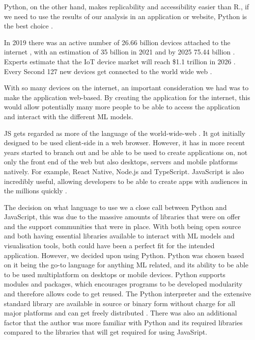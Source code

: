 	Python, on the other hand, makes replicability and accessibility easier than R., if we need to use the results of our analysis in an application or website, Python is the best choice \cite{r_vs_py}.
	
	In 2019 there was an active number of 26.66 billion devices attached to the internet \cite{securitytoday, statista_iot}, with an estimation of 35 billion in 2021 \cite{securitytoday} and by 2025 75.44 billion \cite{statista_iot}. Experts estimate that the IoT device market will reach \$1.1 trillion in 2026 \cite{securitytoday}. Every Second 127 new devices get connected to the world wide web \cite{securitytoday}.
	
	With so many devices on the internet, an important consideration we had was to make the application web-based. By creating the application for the internet, this would allow potentially many more people to be able to access the application and interact with the different ML models. 
	
	JS gets regarded as more of the language of the world-wide-web \cite{web_foundation}. It got initially designed to be used client-side in a web browser. However, it has in more recent years started to branch out and be able to be used to create applications on, not only the front end of the web but also desktops, servers and mobile platforms natively. For example, React Native, Node.js and TypeScript. JavaScript is also incredibly useful, allowing developers to be able to create apps with audiences in the millions quickly \cite{js_springboard}.
	
	The decision on what language to use we a close call between Python and JavaScript, this was due to the massive amounts of libraries that were on offer and the support communities that were in place. With both being open source and both having essential libraries available to interact with ML models and visualisation tools, both could have been a perfect fit for the intended application. However, we decided upon using Python. Python was chosen based on it being the go-to language for anything ML related, and its ability to be able to be used multiplatform on desktops or mobile devices. Python supports modules and packages, which encourages programs to be developed modularity and therefore allows code to get reused. The Python interpreter and the extensive standard library are available in source or binary form without charge for all major platforms and can get freely distributed \cite{python_desc}. There was also an additional factor that the author was more familiar with Python and its required libraries compared to the libraries that will get required for using JavaSript.

